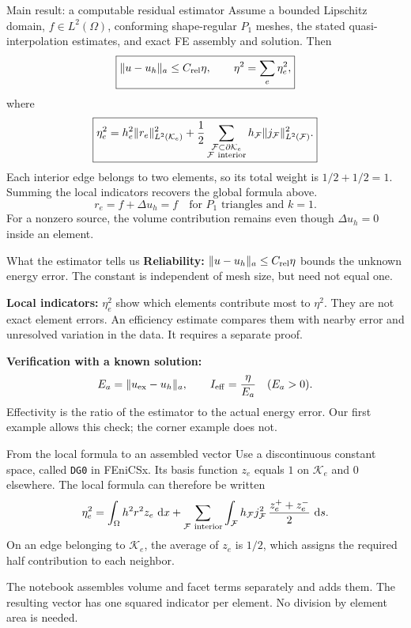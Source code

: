\documentclass[11pt,aspectratio=169]{beamer}
\newcommand{\dd}{\,\mathrm d}
\newcommand{\Om}{\Omega}
\newcommand{\norm}[2][]{\lVert#2\rVert_{#1}}
\begin{document}
\begin{frame}{Main result: a computable residual estimator}
Assume a bounded Lipschitz domain, $f\in L^2(\Om)$, conforming shape-regular
$P_1$ meshes, the stated quasi-interpolation estimates, and exact FE assembly
and solution. Then
\[
\boxed{\norm[a]{u-u_h}\le C_{\rm rel}\eta,\qquad
\eta^2=\sum_e\eta_e^2,}
\]
where
\[
\boxed{\eta_e^2=h_e^2\norm[L^2(\mathcal K_e)]{r_e}^2
+\frac12\sum_{\substack{\mathcal F\subset\partial\mathcal K_e\\
                       \mathcal F\ {\rm interior}}}
h_{\mathcal F}\norm[L^2(\mathcal F)]{j_{\mathcal F}}^2.}
\]
Each interior edge belongs to two elements, so its total weight is
$1/2+1/2=1$. Summing the local indicators recovers the global formula above.
\[
r_e=f+\Delta u_h=f\quad\text{for }P_1\text{ triangles and }k=1.
\]
For a nonzero source, the volume contribution remains even though
$\Delta u_h=0$ inside an element.
\end{frame}

\begin{frame}{What the estimator tells us}
\textbf{Reliability:}
$\norm[a]{u-u_h}\le C_{\rm rel}\eta$ bounds the unknown energy error.
The constant is independent of mesh size, but need not equal one.

\vspace{0.25cm}
\textbf{Local indicators:} $\eta_e^2$ show which elements contribute most
to $\eta^2$. They are not exact element errors. An efficiency estimate compares
them with nearby error and unresolved variation in the data. It requires a
separate proof.

\vspace{0.25cm}
\textbf{Verification with a known solution:}
\[
E_a=\norm[a]{u_{\rm ex}-u_h},\qquad
I_{\rm eff}=\frac{\eta}{E_a}\quad(E_a>0).
\]
Effectivity is the ratio of the estimator to the actual energy error.
Our first example allows this check; the corner example does not.
\end{frame}

\begin{frame}{From the local formula to an assembled vector}
Use a discontinuous constant space, called \texttt{DG0} in FEniCSx.
Its basis function $z_e$ equals $1$ on $\mathcal K_e$ and $0$ elsewhere.
The local formula can therefore be written
\[
\eta_e^2=\int_\Om h^2r^2z_e\,\dd x+
\sum_{\mathcal F\ {\rm interior}}\int_{\mathcal F}
h_{\mathcal F}j_{\mathcal F}^2\,
\frac{z_e^++z_e^-}{2}\,\dd s.
\]
On an edge belonging to $\mathcal K_e$, the average of $z_e$ is $1/2$,
which assigns the required half contribution to each neighbor.

The notebook assembles volume and facet terms separately and adds them.
The resulting vector has one squared indicator per element.
No division by element area is needed.

\end{frame}
\end{document}
